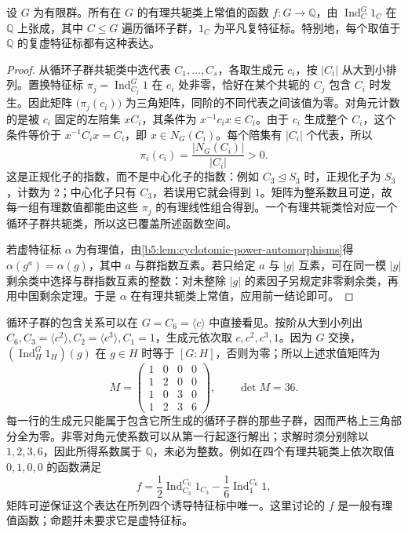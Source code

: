 \begin{proposition}[有理值版本]\label{b5:prop:rational-valued-artin}
	设 \(G\) 为有限群。所有在 \(G\) 的有理共轭类上常值的函数 \(f:G\to\mathbb Q\)，由 \(\operatorname{Ind}_C^G1_C\) 在 \(\mathbb Q\) 上张成，其中 \(C\le G\) 遍历循环子群，\(1_C\) 为平凡复特征标。特别地，每个取值于 \(\mathbb Q\) 的复虚特征标都有这种表达。
\end{proposition}
\begin{proof}
	从循环子群共轭类中选代表 \(C_1,\ldots,C_s\)，各取生成元 \(c_i\)，按 \(|C_i|\) 从大到小排列。置换特征标 \(\pi_j=\operatorname{Ind}_{C_j}^G1\) 在 \(c_i\) 处非零，恰好在某个共轭的 \(C_j\) 包含 \(C_i\) 时发生。因此矩阵 \(\bigl(\pi_j(c_i)\bigr)\) 为三角矩阵，同阶的不同代表之间该值为零。对角元计数的是被 \(c_i\) 固定的左陪集 \(xC_i\)，其条件为 \(x^{-1}c_ix\in C_i\)。由于 \(c_i\) 生成整个 \(C_i\)，这个条件等价于 \(x^{-1}C_ix=C_i\)，即 \(x\in N_G(C_i)\)。每个陪集有 \(|C_i|\) 个代表，所以
	\[
		\pi_i(c_i)=\frac{|N_G(C_i)|}{|C_i|}>0.
	\]
	这是正规化子的指数，而不是中心化子的指数：例如 \(C_3\trianglelefteq S_3\) 时，正规化子为 \(S_3\)，计数为 \(2\)；中心化子只有 \(C_3\)，若误用它就会得到 \(1\)。矩阵为整系数且可逆，故每一组有理数值都能由这些 \(\pi_j\) 的有理线性组合得到。一个有理共轭类恰对应一个循环子群共轭类，所以这已覆盖所述函数空间。

	若虚特征标 \(\alpha\) 为有理值，由\cref{b5:lem:cyclotomic-power-automorphisms}得 \(\alpha(g^a)=\alpha(g)\)，其中 \(a\) 与群指数互素。若只给定 \(a\) 与 \(|g|\) 互素，可在同一模 \(|g|\) 剩余类中选择与群指数互素的整数：对未整除 \(|g|\) 的素因子另规定非零剩余类，再用中国剩余定理。于是 \(\alpha\) 在有理共轭类上常值，应用前一结论即可。
\end{proof}

循环子群的包含关系可以在 \(G=C_6=\langle c\rangle\) 中直接看见。按阶从大到小列出 \(C_6,C_3=\langle c^2\rangle,C_2=\langle c^3\rangle,C_1=1\)，生成元依次取 \(c,c^2,c^3,1\)。因为 \(G\) 交换，\((\operatorname{Ind}_H^G1_H)(g)\) 在 \(g\in H\) 时等于 \([G:H]\)，否则为零；所以上述求值矩阵为
\[
	M=\begin{pmatrix}
		1&0&0&0\\
		1&2&0&0\\
		1&0&3&0\\
		1&2&3&6
	\end{pmatrix},\qquad \det M=36.
\]
每一行的生成元只能属于包含它所生成的循环子群的那些子群，因而严格上三角部分全为零。非零对角元使系数可以从第一行起逐行解出；求解时须分别除以 \(1,2,3,6\)，因此所得系数属于 \(\mathbb Q\)，未必为整数。例如在四个有理共轭类上依次取值 \(0,1,0,0\) 的函数满足
\[
	f=\frac12\operatorname{Ind}_{C_3}^{C_6}1_{C_3} -\frac16\operatorname{Ind}_{1}^{C_6}1,
\]
矩阵可逆保证这个表达在所列四个诱导特征标中唯一。这里讨论的 \(f\) 是一般有理值函数；命题并未要求它是虚特征标。
